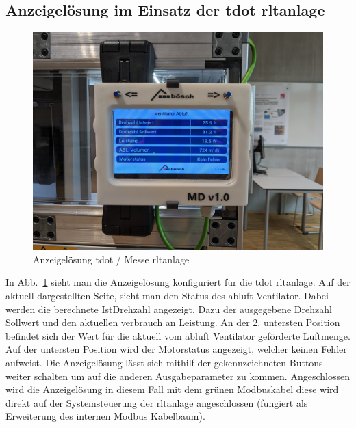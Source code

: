 \subsection{Anzeigelösung im Einsatz der \gls{tdot} \ac{rltanlage}}
\begin{figure}[H]
	\centering
	\includegraphics[width=0.7\linewidth]{Bilder/tdot_anzeige}
	\caption{Anzeigelösung \gls{tdot} / Messe \ac{rltanlage}} 
	\label{fig:tdot_anzeige}
\end{figure}

In Abb.~\ref{fig:tdot_anzeige} sieht man die Anzeigelösung konfiguriert für die \gls{tdot} \ac{rltanlage}. Auf der aktuell dargestellten Seite, sieht man den Status des \gls{abluft} Ventilator. Dabei werden die berechnete IstDrehzahl angezeigt. Dazu der ausgegebene Drehzahl Sollwert und den aktuellen verbrauch an Leistung. An der 2. untersten Position befindet sich der Wert für die aktuell vom \gls{abluft} Ventilator geförderte Luftmenge. Auf der untersten Position wird der Motorstatus angezeigt, welcher keinen Fehler aufweist. Die Anzeigelösung lässt sich mithilf der gekennzeichneten Buttons weiter schalten um auf die anderen Ausgabeparameter zu kommen. Angeschlossen wird die Anzeigelösung in diesem Fall mit dem grünen Modbuskabel diese wird direkt auf der Systemsteuerung der \ac{rltanlage} angeschlossen (fungiert als Erweiterung des internen Modbus Kabelbaum).

